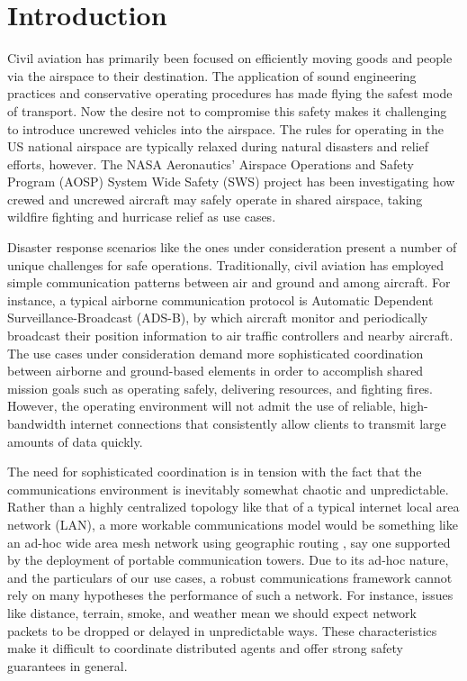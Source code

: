 \section{Introduction}
Civil aviation has primarily been focused on efficiently moving goods
and people via the airspace to their destination. The application of
sound engineering practices and conservative operating procedures has
made flying the safest mode of transport. Now the desire not to
compromise this safety makes it challenging to introduce uncrewed
vehicles into the airspace. The rules for operating in the US national
airspace are typically relaxed during natural disasters and relief
efforts, however. The NASA Aeronautics' Airspace Operations and Safety
Program (AOSP) System Wide Safety (SWS) project has been investigating
how crewed and uncrewed aircraft may safely operate in shared
airspace, taking wildfire fighting and hurricase relief as use cases.

Disaster response scenarios like the ones under consideration present
a number of unique challenges for safe operations. Traditionally,
civil aviation has employed simple communication patterns between air
and ground and among aircraft. For instance, a typical airborne
communication protocol is Automatic Dependent Surveillance-Broadcast
(ADS-B), by which aircraft monitor and periodically broadcast their
position information to air traffic controllers and nearby
aircraft. The use cases under consideration demand more sophisticated
coordination between airborne and ground-based elements in order to
accomplish shared mission goals such as operating safely, delivering
resources, and fighting fires. However, the operating environment will
not admit the use of reliable, high-bandwidth internet connections
that consistently allow clients to transmit large amounts of data
quickly.

The need for sophisticated coordination is in tension with the fact
that the communications environment is inevitably somewhat chaotic and
unpredictable. Rather than a highly centralized topology like that of
a typical internet local area network (LAN), a more workable
communications model would be something like an ad-hoc wide area mesh
network using geographic routing \cite{}, say one supported by the
deployment of portable communication towers. Due to its ad-hoc nature,
and the particulars of our use cases, a robust communications
framework cannot rely on many hypotheses the performance of such a
network. For instance, issues like distance, terrain, smoke, and
weather mean we should expect network packets to be dropped or delayed
in unpredictable ways. These characteristics make it difficult to
coordinate distributed agents and offer strong safety guarantees in
general.

